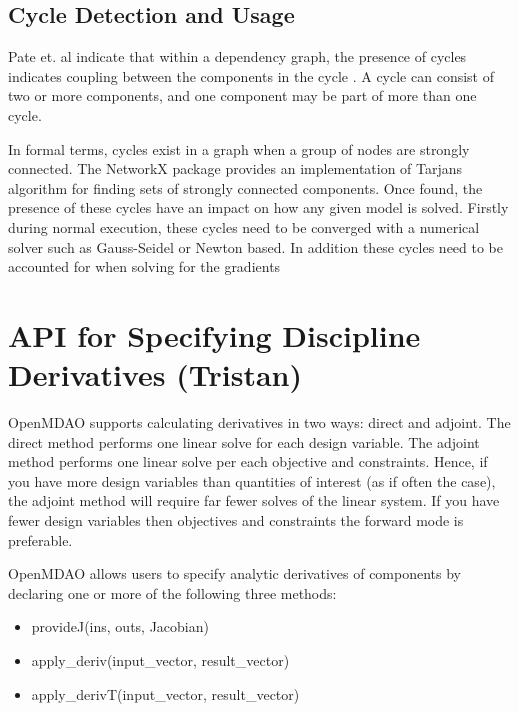 \documentclass[]{aiaa-tc} %
\begin{document}
        
    \subsection{Cycle Detection and Usage}
        Pate et. al indicate that within a dependency graph, the presence of cycles indicates coupling between
        the components in the cycle \cite{graph_problem2013}. A cycle can consist of two or more components, and
        one component may be part of more than one cycle.

        In formal terms, cycles exist in a graph when a group of nodes are strongly connected. The NetworkX package
        provides an implementation of Tarjans algorithm for finding sets of strongly connected
        components\cite{tarjan1972depth,nuutila1994finding}. Once found, the presence of these cycles
        have an impact on how any given model is solved. Firstly during normal execution, these cycles
        need to be converged with a numerical solver such as Gauss-Seidel or Newton based. 
        In addition these cycles need to be accounted for when solving for the gradients 


    \section{API for Specifying Discipline Derivatives (Tristan)}

        OpenMDAO supports calculating derivatives in two ways: direct and adjoint. The direct method performs
        one linear solve for each design variable. The adjoint method performs one linear solve per each objective
        and constraints. Hence, if you have more design variables than quantities of interest (as if often the case),
        the adjoint method will require far fewer solves of the linear system. If you have fewer design variables then
        objectives and constraints the forward mode is preferable.

        OpenMDAO allows users to specify analytic derivatives of components by declaring one or more of the following three
        methods:

        \begin{itemize}
            \item provideJ(ins, outs, Jacobian)
            \item apply\_deriv(input\_vector, result\_vector)
            \item apply\_derivT(input\_vector, result\_vector)
        \end{itemize}
\end{document}

